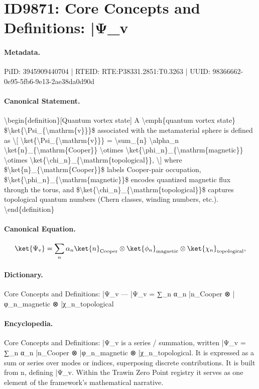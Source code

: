 \section*{ID9871: Core Concepts and Definitions: |Ψ\_v}
\paragraph{Metadata.}
PiID: 3945909440704 | RTEID: RTE:P38331.2851:T0.3263 | UUID: 98366662-0e95-5fb6-9e13-2ae38da0d90d

\paragraph{Canonical Statement.}
\textbackslash{}begin\{definition\}[Quantum vortex state] A \textbackslash{}emph\{quantum vortex state\} \$\textbackslash{}ket\{\textbackslash{}Psi\_\{\textbackslash{}mathrm\{v\}\}\}\$ associated with the metamaterial sphere is defined as \textbackslash{}[ \textbackslash{}ket\{\textbackslash{}Psi\_\{\textbackslash{}mathrm\{v\}\}\} = \textbackslash{}sum\_\{n\} \textbackslash{}alpha\_n \textbackslash{}ket\{n\}\_\{\textbackslash{}mathrm\{Cooper\}\} \textbackslash{}otimes \textbackslash{}ket\{\textbackslash{}phi\_n\}\_\{\textbackslash{}mathrm\{magnetic\}\} \textbackslash{}otimes \textbackslash{}ket\{\textbackslash{}chi\_n\}\_\{\textbackslash{}mathrm\{topological\}\}, \textbackslash{}] where \$\textbackslash{}ket\{n\}\_\{\textbackslash{}mathrm\{Cooper\}\}\$ labels Cooper-pair occupation, \$\textbackslash{}ket\{\textbackslash{}phi\_n\}\_\{\textbackslash{}mathrm\{magnetic\}\}\$ encodes quantized magnetic flux through the torus, and \$\textbackslash{}ket\{\textbackslash{}chi\_n\}\_\{\textbackslash{}mathrm\{topological\}\}\$ captures topological quantum numbers (Chern classes, winding numbers, etc.). \textbackslash{}end\{definition\}

\paragraph{Canonical Equation.}
\[
\ket{\Psi_{\mathrm{v}}} = \sum_{n} \alpha_n \ket{n}_{\mathrm{Cooper}} \otimes \ket{\phi_n}_{\mathrm{magnetic}} \otimes \ket{\chi_n}_{\mathrm{topological}},
\]

\paragraph{Dictionary.}
Core Concepts and Definitions: |Ψ\_v — |Ψ\_v = ∑\_n α\_n |n\_Cooper ⊗ |φ\_n\_magnetic ⊗ |χ\_n\_topological

\paragraph{Encyclopedia.}
Core Concepts and Definitions: |Ψ\_v is a series / summation, written |Ψ\_v = ∑\_n α\_n |n\_Cooper ⊗ |φ\_n\_magnetic ⊗ |χ\_n\_topological. It is expressed as a sum or series over modes or indices, superposing discrete contributions. It is built from n, defining |Ψ\_v. Within the Trawin Zero Point registry it serves as one element of the framework's mathematical narrative.
